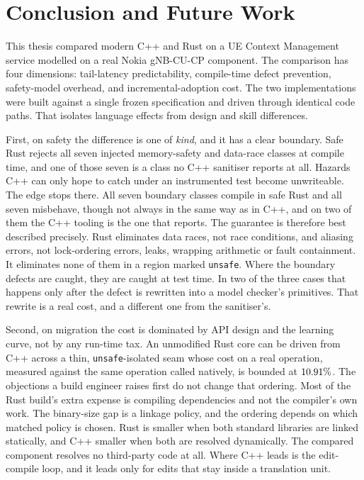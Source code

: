 \documentclass[english,oneside,a4paper,censored,csm,software-track-2020]{HYthesisML}
\begin{document}
\chapter{Conclusion and Future Work\label{chapter:conclusions}}

This thesis compared modern C++ and Rust on a UE Context Management service modelled on a real
Nokia gNB-CU-CP component. The comparison has four dimensions: tail-latency predictability,
compile-time defect prevention, safety-model overhead, and incremental-adoption cost. The two
implementations were built against a single frozen specification and driven through
identical code paths. That isolates language effects from design and skill differences.

First, on safety the difference is one of \emph{kind}, and it has a clear boundary. Safe Rust
rejects all seven injected memory-safety and data-race classes at compile time, and one of
those seven is a class no C++ sanitiser reports at all. Hazards C++ can only hope to catch under
an instrumented test become unwriteable. The edge stops there. All seven boundary classes compile
in safe Rust and all seven misbehave, though not always in the same way as in C++, and on two of
them the C++ tooling is the one that reports. The guarantee is therefore best described
precisely. Rust eliminates data races, not race conditions, and aliasing errors, not
lock-ordering errors, leaks, wrapping arithmetic or fault containment. It eliminates none of
them in a region marked \texttt{unsafe}. Where the boundary defects are caught, they are caught
at test time. In two of the three cases that happens only after the defect is rewritten into a
model checker's primitives. That rewrite is a real cost, and a different one from the
sanitiser's.

Second, on migration the cost is dominated by API design and the learning curve, not by any
run-time tax. An unmodified Rust core can be driven from C++ across a thin, \texttt{unsafe}-isolated
seam whose cost on a real operation, measured against the same operation called natively, is
bounded at $10.91\%$. The objections a build engineer raises first do not change that
ordering. Most of the Rust build's extra expense is compiling dependencies and not the compiler's
own work. The binary-size gap is a linkage policy, and the ordering depends on which matched policy
is chosen. Rust is smaller when both standard libraries are linked statically, and C++ smaller
when both are resolved dynamically. The compared component resolves no third-party code at
all. Where C++ leads is the edit-compile loop, and it leads only for edits that stay inside a
translation unit.
\end{document}
